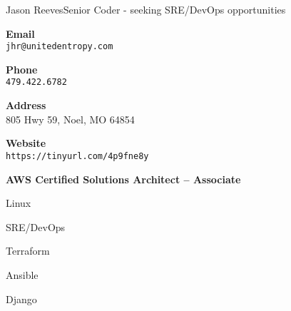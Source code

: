 \documentclass{article}
\begin{document}
\raggedbottom
\begin{cv}[avatar]{Jason Reeves}{Senior Coder - seeking SRE/DevOps opportunities}
\cvsidebar %



\begin{cvitem}[Envelope][4]
    \textbf{Email}\\
    \texttt{jhr@unitedentropy.com}
\end{cvitem}

\cvseparator[3]
\begin{cvitem}[Phone][4]
    \textbf{Phone}\\
    \texttt{479.422.6782}
\end{cvitem}

\cvseparator[3]
\begin{cvitem}[Home][4]
    \textbf{Address}\\
    805 Hwy 59, Noel, MO  64854
\end{cvitem}

\cvseparator[3]
\begin{cvitem}[Globe][4]
    \textbf{Website}\\
    \texttt{https://tinyurl.com/4p9fne8y}
\end{cvitem}


\begin{cvitem}
  \footnotesize \textbf{AWS Certified Solutions Architect – Associate}
\end{cvitem}

\cvseparator
\begin{cvitem}
  \footnotesize Linux
\end{cvitem}

\cvseparator
\begin{cvitem}
  \footnotesize SRE/DevOps
\end{cvitem}

\cvseparator
\begin{cvitem}
  \footnotesize Terraform
\end{cvitem}

\cvseparator
\begin{cvitem}
  \footnotesize Ansible
\end{cvitem}

\cvseparator
\begin{cvitem}
  \footnotesize Django
\end{cvitem}


\end{cv}
\end{document}
